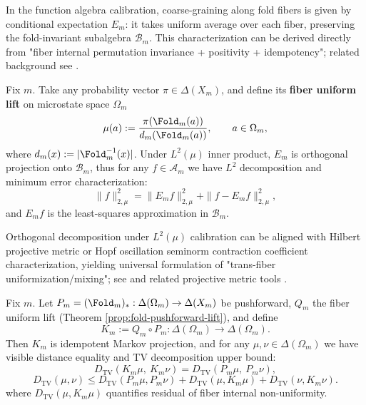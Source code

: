 In the function algebra calibration, coarse-graining along fold fibers is given by conditional expectation $E_m$: it takes uniform average over each fiber, preserving the fold-invariant subalgebra $\mathcal{B}_m$. This characterization can be derived directly from "fiber internal permutation invariance + positivity + idempotency"; related background see \cite{WaltersErgodicTheory}.

Fix $m$. Take any probability vector $\pi\in\Delta(X_m)$, and define its \textbf{fiber uniform lift} on microstate space $\Omega_m$
\begin{equation}
\label{eq:pom-fiber-uniform-lift}
\mu(a):=\frac{\pi(\Fold_m(a))}{d_m(\Fold_m(a))},\qquad a\in\Omega_m,
\end{equation}
where $d_m(x):=|\Fold_m^{-1}(x)|$. Under $L^2(\mu)$ inner product, $E_m$ is orthogonal projection onto $\mathcal{B}_m$, thus for any $f\in\mathcal{A}_m$ we have $L^2$ decomposition and minimum error characterization:
\begin{equation}
\label{eq:pom-L2-pythagoras}
\|f\|_{2,\mu}^2=\|E_m f\|_{2,\mu}^2+\|f-E_m f\|_{2,\mu}^2,
\end{equation}
and $E_m f$ is the least-squares approximation in $\mathcal{B}_m$.

\begin{remark}\label{rem:pom-fold-projective-metric}
Orthogonal decomposition under $L^2(\mu)$ calibration can be aligned with Hilbert projective metric or Hopf oscillation seminorm contraction coefficient characterization, yielding universal formulation of "trans-fiber uniformization/mixing"; see \cite{GaubertQu2015DobrushinCones} and related projective metric tools \cite{ReebKastoryanoWolf2011HilbertProjectiveQuantum}.
\end{remark}

Fix $m$. Let $P_m=(\Fold_m)_*:\Delta(\Omega_m)\to\Delta(X_m)$ be pushforward, $Q_m$ the fiber uniform lift (Theorem \ref{prop:fold-pushforward-lift}), and define
\begin{equation}
\label{eq:pom-Km-def}
K_m:=Q_m\circ P_m:\Delta(\Omega_m)\to\Delta(\Omega_m).
\end{equation}
Then $K_m$ is idempotent Markov projection, and for any $\mu,\nu\in\Delta(\Omega_m)$ we have visible distance equality and TV decomposition upper bound:
\begin{equation}
\label{eq:pom-tv-visible-equality}
D_{\mathrm{TV}}(K_m\mu,\ K_m\nu)=D_{\mathrm{TV}}(P_m\mu,\ P_m\nu),
\end{equation}
\begin{equation}
\label{eq:pom-tv-decomposition-upper}
D_{\mathrm{TV}}(\mu,\nu)\le D_{\mathrm{TV}}(P_m\mu,P_m\nu)+D_{\mathrm{TV}}(\mu,K_m\mu)+D_{\mathrm{TV}}(\nu,K_m\nu).
\end{equation}
where $D_{\mathrm{TV}}(\mu,K_m\mu)$ quantifies residual of fiber internal non-uniformity.


